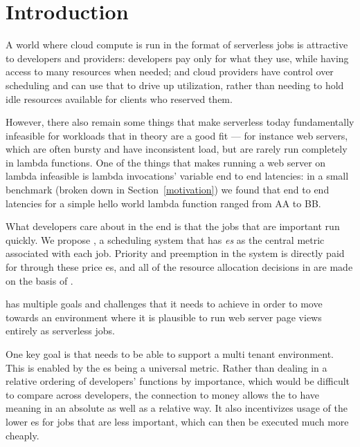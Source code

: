 \section{Introduction}

A world where cloud compute is run in the format of serverless jobs is
attractive to developers and providers: developers pay only for what they use,
while having access to many resources when needed; and cloud providers have
control over scheduling and can use that to drive up utilization, rather than
needing to hold idle resources available for clients who reserved them.


However, there also remain some things that make serverless today fundamentally
infeasible for workloads that in theory are a good fit --- for instance web
servers, which are often bursty and have inconsistent load, but are rarely run
completely in lambda functions.\cite{TODO} One of the things that makes running
a web server on lambda infeasible is lambda invocations' variable end to end
latencies: in a small benchmark (broken down in Section~\ref{motivation}) we
found that end to end latencies for a simple hello world lambda function ranged
from AA to BB.


What developers care about in the end is that the jobs that are important run
quickly. We propose \sys{}, a scheduling system that has
\textit{\priceclass{}es} as the central metric associated with each job.
Priority and preemption in the system is directly paid for through these price
\class{}es, and all of the resource allocation decisions in \sys{} are made on
the basis of \class{}. 

\Sys{} has multiple goals and challenges that it needs to achieve in order to
move towards an environment where it is plausible to run web server page views
entirely as serverless jobs. 

One key goal is that \sys{} needs to be able to support a multi tenant
environment. This is enabled by the \priceclass{}es being a universal metric.
Rather than dealing in a relative ordering of developers' functions by
importance, which would be difficult to compare across developers, the
connection to money allows the \class{} to have meaning in an absolute as well
as a relative way. It also incentivizes usage of the lower \class{}es for jobs
that are less important, which can then be executed much more cheaply.


